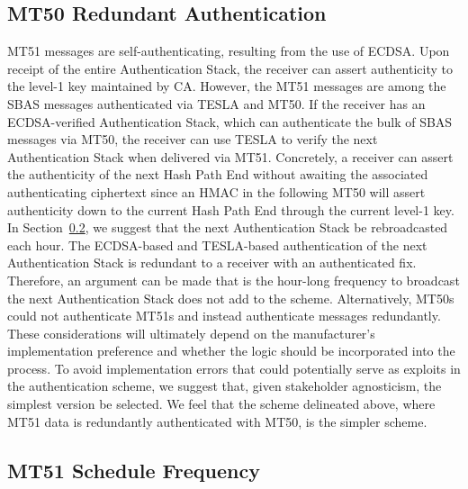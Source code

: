 \documentclass[letterpaper,times]{IONconf/IONconf}
\begin{document}
	\subsection{MT50 Redundant Authentication} \label{sub:mt50_redundant_authentication}

		MT51 messages are self-authenticating, resulting from the use of ECDSA.
		Upon receipt of the entire Authentication Stack, the receiver can assert authenticity to the level-1 key maintained by CA.
		However, the MT51 messages are among the SBAS messages authenticated via TESLA and MT50.
		If the receiver has an ECDSA-verified Authentication Stack, which can authenticate the bulk of SBAS messages via MT50, the receiver can use TESLA to verify the next Authentication Stack when delivered via MT51.
		Concretely, a receiver can assert the authenticity of the next Hash Path End without awaiting the associated authenticating ciphertext since an HMAC in the following MT50 will assert authenticity down to the current Hash Path End through the current level-1 key.
		In Section~\ref{sub:mt51_schedule_frequency}, we suggest that the next Authentication Stack be rebroadcasted each hour.
		The ECDSA-based and TESLA-based authentication of the next Authentication Stack is redundant to a receiver with an authenticated fix.
		Therefore, an argument can be made that is the hour-long frequency to broadcast the next Authentication Stack does not add to the scheme.
		Alternatively, MT50s could not authenticate MT51s and instead authenticate messages redundantly.
		These considerations will ultimately depend on the manufacturer's implementation preference and whether the logic should be incorporated into the process.
		To avoid implementation errors that could potentially serve as exploits in the authentication scheme, we suggest that, given stakeholder agnosticism, the simplest version be selected.
		We feel that the scheme delineated above, where MT51 data is redundantly authenticated with MT50, is the simpler scheme.

	\subsection{MT51 Schedule Frequency} \label{sub:mt51_schedule_frequency}
\end{document}
